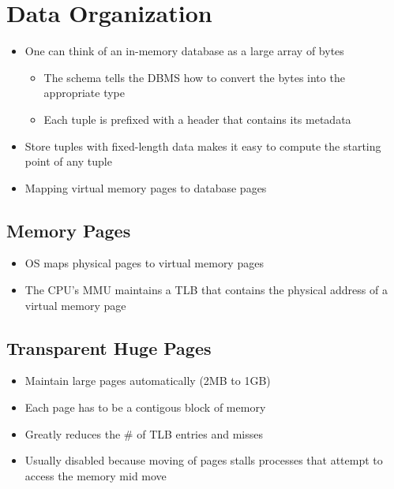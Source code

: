 \documentclass[11pt]{article}
\begin{document}
\maketitle
\thispagestyle{plain}

\section{Data Organization}
\begin{itemize}
    \item One can think of an in-memory database as a large array of bytes
    \begin{itemize}
        \item The schema tells the DBMS how to convert the bytes into the appropriate type
        \item Each tuple is prefixed with a header that contains its metadata
    \end{itemize}
    \item Store tuples with fixed-length data makes it easy to compute the starting point of any tuple
    \item Mapping virtual memory pages to database pages
\end{itemize}

    \subsection*{Memory Pages}
    \begin{itemize}
        \item OS maps physical pages to virtual memory pages
        \item The CPU's MMU maintains a TLB that contains the physical address of a virtual memory page
    \end{itemize}

    \subsection*{Transparent Huge Pages}
    \begin{itemize}
        \item Maintain large pages automatically (2MB to 1GB)
        \item Each page has to be a contigous block of memory
        \item Greatly reduces the \# of TLB entries and misses
        \item Usually disabled because moving of pages stalls processes that attempt to access the memory mid move
    \end{itemize}
\end{document}
